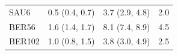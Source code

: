 \documentclass{aa}
\begin{document}
\begin{table}
\begin{tabular}{llll}
   SAU6          & 0.5 (0.4, 0.7) &  3.7 (2.9, 4.8) &  2.0\\
   BER56         & 1.6 (1.4, 1.7) &  8.1 (7.4, 8.9) &  4.5\\
   BER102        & 1.0 (0.8, 1.5) &  3.8 (3.0, 4.9) &  2.5\\
  \hline
  \end{tabular}
  \end{table}
\end{document}
